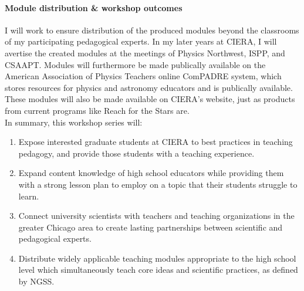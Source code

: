 \documentclass[11pt, preprint]{aastex}
\begin{document}
\paragraph{Module distribution \& workshop outcomes} 
I will work to ensure distribution of the produced modules beyond the classrooms of my participating pedagogical experts.
In my later years at CIERA, I will avertise the created modules at the meetings of Physics Northwest, ISPP, and CSAAPT.
Modules will furthermore be made publically available on the American Association of Physics Teachers online ComPADRE system, which stores resources for physics and astronomy educators and is publically available.
These modules will also be made available on CIERA's website, just as products from current programs like Reach for the Stars are.
 \vspace{2pt}\\
In summary, this workshop series will: 
\vspace{-14pt}
\begin{enumerate}
\item Expose interested graduate students at CIERA to best practices in teaching pedagogy, and provide those students with a teaching experience.
\vspace{-9pt}
\item Expand content knowledge of high school educators while providing them with a strong lesson plan to employ on a topic that their students struggle to learn.
\vspace{-9pt}
\item Connect university scientists with teachers and teaching organizations in the greater Chicago area to create lasting partnerships between scientific and pedagogical experts.
\vspace{-9pt}
\item Distribute widely applicable teaching modules appropriate to the high school level which simultaneously teach core ideas and scientific practices, as defined by NGSS.
\vspace{-9pt}
\end{enumerate}



\vspace{-22pt}
\end{document}
